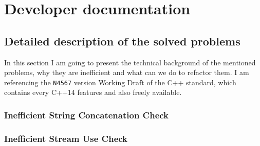 \section{Developer documentation}
\subsection{Detailed description of the solved problems}
\par In this section I am going to present the technical background of the mentioned problems, why they are inefficient and what can we do to refactor them. I am referencing the \verb|N4567|\cite{cpp_standard} version Working Draft of the C++ standard, which contains every C++14 features and also freely available. 
\subsubsection{Inefficient String Concatenation Check}
\subsubsection{Inefficient Stream Use Check}
